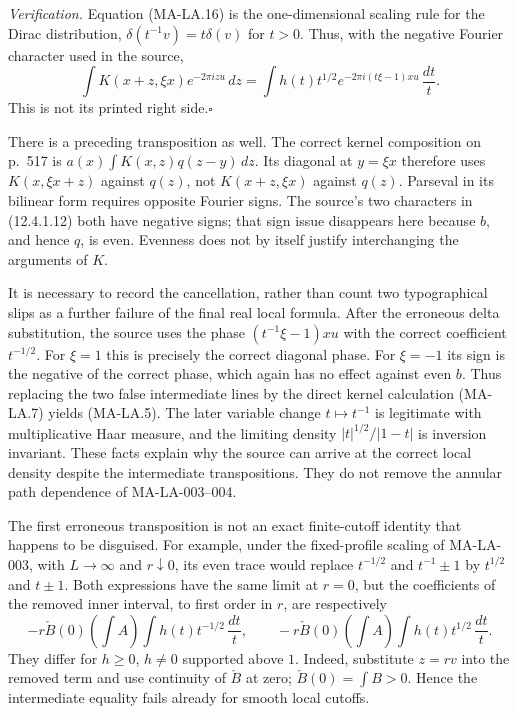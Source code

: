 \emph{Verification.}
Equation (MA-LA.16) is the one-dimensional scaling rule for the
Dirac distribution, $\delta(t^{-1}v)=t\delta(v)$ for $t>0$.
Thus, with the negative Fourier character used in the source,
\[
 \int K(x+z,\xi x)e^{-2\pi i zu}\,dz
  =\int h(t)t^{1/2}
          e^{-2\pi i(t\xi-1)xu}\,\frac{dt}{t}.
 \tag{MA-LA.17}
\]
This is not its printed right side.\hfill$\square$

There is a preceding transposition as well.  The correct kernel
composition on p.~517 is
$a(x)\int K(x,z)q(z-y)\,dz$.  Its diagonal at $y=\xi x$
therefore uses $K(x,\xi x+z)$ against $q(z)$, not
$K(x+z,\xi x)$ against $q(z)$.  Parseval in its bilinear form
requires opposite Fourier signs.  The source's two characters in
(12.4.1.12) both have negative signs; that sign issue disappears
here because $b$, and hence $q$, is even.  Evenness does not by
itself justify interchanging the arguments of $K$.

It is necessary to record the cancellation, rather than count two
typographical slips as a further failure of the final real local
formula.  After the erroneous delta substitution, the source uses
the phase $(t^{-1}\xi-1)xu$ with the correct coefficient
$t^{-1/2}$.  For $\xi=1$ this is precisely the correct diagonal
phase.  For $\xi=-1$ its sign is the negative of the correct phase,
which again has no effect against even $b$.  Thus replacing the
two false intermediate lines by the direct kernel calculation
(MA-LA.7) yields (MA-LA.5).  The later variable change $t\mapsto
t^{-1}$ is legitimate with multiplicative Haar measure, and the
limiting density $|t|^{1/2}/|1-t|$ is inversion invariant.  These
facts explain why the source can arrive at the correct local
density despite the intermediate transpositions.  They do not
remove the annular path dependence of MA-LA-003--004.

The first erroneous transposition is not an exact finite-cutoff
identity that happens to be disguised.  For example, under the
fixed-profile scaling of MA-LA-003, with $L\to\infty$ and
$r\downarrow0$, its even trace would replace $t^{-1/2}$ and
$t^{-1}\pm1$ by $t^{1/2}$ and $t\pm1$.  Both expressions have
the same limit at $r=0$, but the coefficients of the removed inner
interval, to first order in $r$, are respectively
\[
 -r\check B(0)\!\left(\int A\right)
       \int h(t)t^{-1/2}\,\frac{dt}{t},
 \qquad
 -r\check B(0)\!\left(\int A\right)
       \int h(t)t^{1/2}\,\frac{dt}{t}.
\]
They differ for $h\ge0$, $h\ne0$ supported above $1$.
Indeed, substitute $z=rv$ into the removed term and use continuity
of $\check B$ at zero; $\check B(0)=\int B>0$.  Hence the
intermediate equality fails already for smooth local cutoffs.

